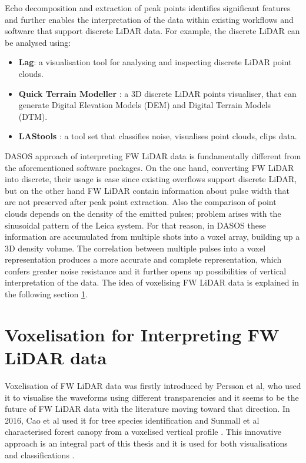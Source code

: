 \documentclass{subfiles}
\begin{document}
	\par  Echo decomposition and extraction of peak points identifies significant features and further enables the interpretation of the data within existing workflows and software that support discrete LiDAR data. For example, the discrete LiDAR can be analysed using: 
	
	\begin{itemize}
	\item \textbf{Lag}: a visualisation tool for analysing and inspecting discrete LiDAR point clouds. 
	
	\item \textbf{Quick Terrain Modeller} : a 3D discrete LiDAR points visualiser, that can generate Digital Elevation Models (DEM) and Digital Terrain Models (DTM).
	
	\item \textbf{LAStools} : a tool set that classifies noise, visualises point clouds, clips data.  
	\end{itemize}
		
	\par DASOS approach of interpreting FW LiDAR data is fundamentally different from the aforementioned software packages. On the one hand, converting FW LiDAR into discrete, their usage is ease since existing overflows support discrete LiDAR, but on the other hand FW LiDAR contain information about pulse width that are not preserved after peak point extraction. Also the comparison of point clouds depends on the density of the emitted pulses; problem arises with the sinusoidal pattern of the Leica system. For that reason, in DASOS these information are accumulated from multiple shots into a voxel array, building up a 3D density volume. The correlation between multiple pulses into a voxel representation produces a more accurate and complete representation, which confers greater noise resistance and it further opens up possibilities of vertical interpretation of the data. The idea of voxelising FW LiDAR data is explained in the following section \ref{Voxelisation}.  
	
		
	 \section{Voxelisation for Interpreting FW LiDAR data}\label{Voxelisation}
		
	\par Voxelisation of FW LiDAR data was firstly introduced by Persson et al, who used it to visualise the waveforms using different transparencies \cite{Persson2005} and it seems to be the future of FW LiDAR data with the literature moving toward that direction. In 2016, Cao et al used it for tree species identification \cite{Cao2016} and Sunmall et al characterised forest canopy from a voxelised vertical profile \cite{Sumnall2016}. This innovative approach is an integral part of this thesis and it is used for both visualisations and classifications \cite{Miltiadou2014}\cite{Miltiadou2015}. 
\end{document}

